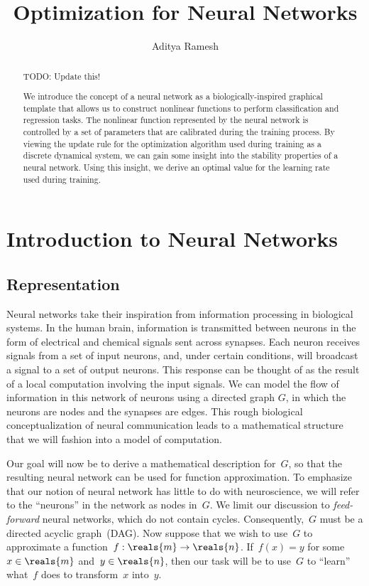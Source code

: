 \documentclass[11pt,a4paper]{article}
\title{Optimization for Neural Networks}
\author{Aditya Ramesh}
\date{}
\numberwithin{equation}{section}
\begin{document}
\maketitle
\begin{abstract}
TODO: Update this!

We introduce the concept of a neural network as a biologically-inspired
graphical template that allows us to construct nonlinear functions to perform
classification and regression tasks. The nonlinear function represented by the
neural network is controlled by a set of parameters that are calibrated during
the training process. By viewing the update rule for the optimization algorithm
used during training as a discrete dynamical system, we can gain some insight
into the stability properties of a neural network. Using this insight, we derive
an optimal value for the learning rate used during training.
\end{abstract}

\section{Introduction to Neural Networks}
\subsection{Representation}

Neural networks take their inspiration from information processing in biological
systems. In the human brain, information is transmitted between neurons in the
form of electrical and chemical signals sent across synapses. Each neuron
receives signals from a set of input neurons, and, under certain conditions,
will broadcast a signal to a set of output neurons. This response can be thought
of as the result of a local computation involving the input signals. We can
model the flow of information in this network of neurons using a directed graph
$G$, in which the neurons are nodes and the synapses are edges. This rough
biological conceptualization of neural communication leads to a mathematical
structure that we will fashion into a model of computation.

Our goal will now be to derive a mathematical description for~$G$, so that the
resulting neural network can be used for function approximation. To emphasize
that our notion of neural network has little to do with neuroscience, we will
refer to the ``neurons'' in the network as nodes in~$G$. We limit our discussion
to \emph{feed-forward} neural networks, which do not contain cycles.
Consequently,~$G$ must be a directed acyclic graph~(DAG). Now suppose that we
wish to use~$G$ to approximate a function~$f: \reals{m} \to \reals{n}$. If~$f(x)
= y$ for some~$x \in \reals{m}$ and~$y \in \reals{n}$, then our task will be to
use~$G$ to ``learn'' what~$f$ does to transform~$x$ into~$y$.
\end{document}
